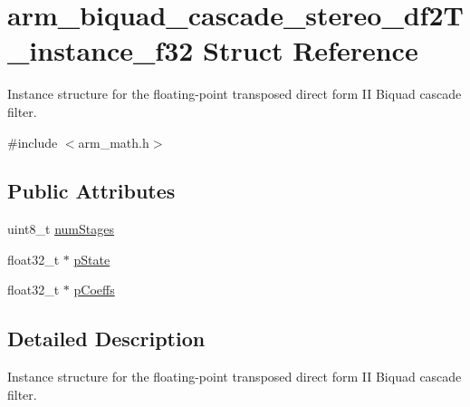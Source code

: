 \hypertarget{structarm__biquad__cascade__stereo__df2_t__instance__f32}{\section{arm\-\_\-biquad\-\_\-cascade\-\_\-stereo\-\_\-df2\-T\-\_\-instance\-\_\-f32 Struct Reference}
\label{structarm__biquad__cascade__stereo__df2_t__instance__f32}
}


Instance structure for the floating-\/point transposed direct form I\-I Biquad cascade filter.  




{\ttfamily \#include $<$arm\-\_\-math.\-h$>$}

\subsection*{Public Attributes}
\begin{DoxyCompactItemize}
\item 
uint8\-\_\-t \hyperlink{structarm__biquad__cascade__stereo__df2_t__instance__f32_a5655328252da5c2c2425ceed253bc4f1}{num\-Stages}
\item 
float32\-\_\-t $\ast$ \hyperlink{structarm__biquad__cascade__stereo__df2_t__instance__f32_a2cb00048bb1fe957a03c1ff56dfaf8f0}{p\-State}
\item 
float32\-\_\-t $\ast$ \hyperlink{structarm__biquad__cascade__stereo__df2_t__instance__f32_a58b15644de62a632c5e9d4a563569dc6}{p\-Coeffs}
\end{DoxyCompactItemize}


\subsection{Detailed Description}
Instance structure for the floating-\/point transposed direct form I\-I Biquad cascade filter. 

